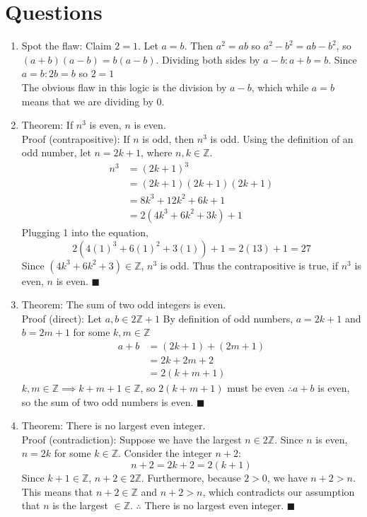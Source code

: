 \documentclass{article}
\begin{document}
\newpage
\section{Questions}
\begin{enumerate}
  \item Spot the flaw: Claim $2 = 1$. Let $a = b$. Then $a^{2} = ab$ so $a^{2} - b^{2} = ab - b^{2}$, so $(a + b)(a - b) = b(a - b)$.
    Dividing both sides by $a - b: a + b = b$. Since $a = b: 2b = b$ so $2 = 1$ \\
    The obvious flaw in this logic is the division by $a - b$, which while $a = b$ means that we are dividing by 0.

  \item Theorem: If $n^{3}$ is even, $n$ is even. \\ 
    Proof (contrapositive): If $n$ is odd, then $n^{3}$ is odd. 
    Using the definition of an odd number, let $n = 2k + 1$, where $n,k \in \mathbb{Z}$. 
    \begin{align*}
      n^{3} &= (2k + 1)^{3} \\
         &= (2k + 1)(2k + 1)(2k + 1) \\
         &= 8k^{3} + 12k^{2} + 6k  + 1 \\
         &= 2(4k^{3} + 6k^{2} + 3k) + 1 
    \end{align*}
    Plugging 1 into the equation,
    \[
      2(4(1)^{3} + 6(1)^{2} + 3(1)) + 1 = 2(13) + 1 = 27
    \]
    Since $(4k^{3} + 6k^{2} + 3) \in \mathbb{Z}$, $n^{3}$ is odd. Thus the contrapositive is true, if $n^{3}$ is even, $n$ is even. $\blacksquare$

  \item Theorem: The sum of two odd integers is even. \\
    Proof (direct): Let $a, b \in 2 \mathbb{Z} + 1$
    By definition of odd numbers,  $a = 2k + 1$ and $b = 2m + 1$ for some $k, m \in \mathbb{Z}$
    \begin{align*}
      a + b &= (2k + 1) + (2m + 1)\\
            &= 2k + 2m + 2 \\
            &= 2(k + m + 1)
    \end{align*}
    $k, m \in \mathbb{Z} \implies k + m + 1 \in \mathbb{Z}$, so $2(k + m + 1)$ must be even $\therefore a + b$ is even, 
    so the sum of two odd numbers is even. $\blacksquare$

  \item Theorem: There is no largest even integer. \\
    Proof (contradiction): Suppose we have the largest $n \in 2 \mathbb{Z}$. 
    Since $n$ is even, $n = 2k$ for some $k \in \mathbb{Z}$. Consider the integer $n + 2$:
    \[
      n + 2 = 2k + 2 = 2(k + 1)
    \]
    Since $k + 1 \in \mathbb{Z}$, $n + 2 \in 2 \mathbb{Z}$. Furthermore, because $2 > 0$, we have $n + 2 > n$.
    This means that $n + 2 \in \mathbb{Z}$ and $n + 2 > n$, which contradicts our assumption that $n$ is the largest $\in \mathbb{Z}$.
    $\therefore$ There is no largest even integer. $\blacksquare$ 


\end{enumerate}
\end{document}
